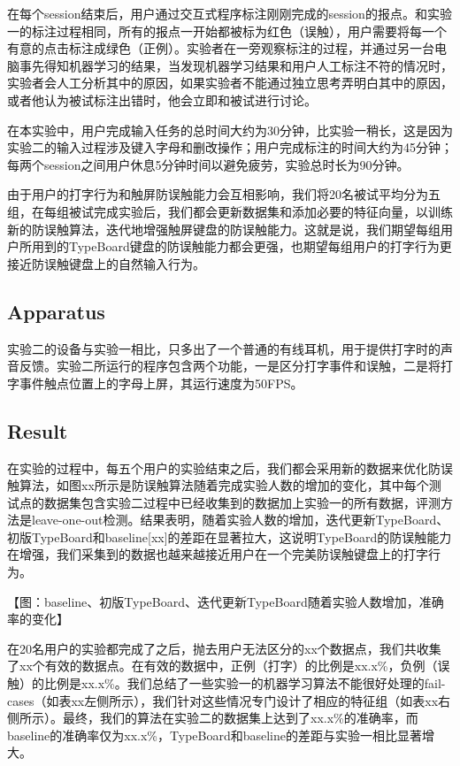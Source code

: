 在每个session结束后，用户通过交互式程序标注刚刚完成的session的报点。和实验一的标注过程相同，所有的报点一开始都被标为红色（误触），用户需要将每一个有意的点击标注成绿色（正例）。实验者在一旁观察标注的过程，并通过另一台电脑事先得知机器学习的结果，当发现机器学习结果和用户人工标注不符的情况时，实验者会人工分析其中的原因，如果实验者不能通过独立思考弄明白其中的原因，或者他认为被试标注出错时，他会立即和被试进行讨论。

在本实验中，用户完成输入任务的总时间大约为30分钟，比实验一稍长，这是因为实验二的输入过程涉及键入字母和删改操作；用户完成标注的时间大约为45分钟；每两个session之间用户休息5分钟时间以避免疲劳，实验总时长为90分钟。

由于用户的打字行为和触屏防误触能力会互相影响，我们将20名被试平均分为五组，在每组被试完成实验后，我们都会更新数据集和添加必要的特征向量，以训练新的防误触算法，迭代地增强触屏键盘的防误触能力。这就是说，我们期望每组用户所用到的TypeBoard键盘的防误触能力都会更强，也期望每组用户的打字行为更接近防误触键盘上的自然输入行为。

\subsection{Apparatus}

实验二的设备与实验一相比，只多出了一个普通的有线耳机，用于提供打字时的声音反馈。实验二所运行的程序包含两个功能，一是区分打字事件和误触，二是将打字事件触点位置上的字母上屏，其运行速度为50FPS。

\subsection{Result}

在实验的过程中，每五个用户的实验结束之后，我们都会采用新的数据来优化防误触算法，如图xx所示是防误触算法随着完成实验人数的增加的变化，其中每个测试点的数据集包含实验二过程中已经收集到的数据加上实验一的所有数据，评测方法是leave-one-out检测。结果表明，随着实验人数的增加，迭代更新TypeBoard、初版TypeBoard和baseline[xx]的差距在显著拉大，这说明TypeBoard的防误触能力在增强，我们采集到的数据也越来越接近用户在一个完美防误触键盘上的打字行为。

【图：baseline、初版TypeBoard、迭代更新TypeBoard随着实验人数增加，准确率的变化】

在20名用户的实验都完成了之后，抛去用户无法区分的xx个数据点，我们共收集了xx个有效的数据点。在有效的数据中，正例（打字）的比例是xx.x\%，负例（误触）的比例是xx.x\%。我们总结了一些实验一的机器学习算法不能很好处理的fail-cases（如表xx左侧所示），我们针对这些情况专门设计了相应的特征组（如表xx右侧所示）。最终，我们的算法在实验二的数据集上达到了xx.x\%的准确率，而baseline的准确率仅为xx.x\%，TypeBoard和baseline的差距与实验一相比显著增大。

